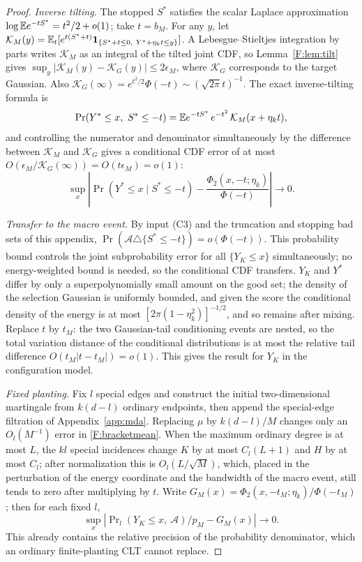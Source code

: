 \begin{proof}
\emph{Inverse tilting.} The stopped $S^*$ satisfies the scalar Laplace approximation
$\log\mathbb E e^{-tS^*}=t^2/2+o(1)$; take $t=b_M$. For any $y$, let
$\mathcal K_M(y)=\mathbb E_t[e^{t(S^*+t)}\mathbf1_{\{S^*+t\le0,\ Y^*+\eta_kt\le y\}}]$. A
Lebesgue--Stieltjes integration by parts writes $\mathcal K_M$ as an integral of the tilted joint
CDF, so Lemma~\ref{F:lem:tilt} gives $\sup_y|\mathcal K_M(y)-\mathcal K_G(y)|\le2\epsilon_M$,
where $\mathcal K_G$ corresponds to the target Gaussian. Also
$\mathcal K_G(\infty)=e^{t^2/2}\Phi(-t)\sim(\sqrt{2\pi}t)^{-1}$. The exact inverse-tilting
formula is
\[
\Pr(Y^*\le x,\ S^*\le-t)=\mathbb E e^{-tS^*}\,e^{-t^2}\,\mathcal K_M(x+\eta_kt),
\]
and controlling the numerator and denominator simultaneously by the difference between
$\mathcal K_M$ and $\mathcal K_G$ gives a conditional CDF error of at most
$O(\epsilon_M/\mathcal K_G(\infty))=O(t\epsilon_M)=o(1)$:
\[
\sup_x\left|\Pr(Y^*\le x\mid S^*\le-t)-\frac{\Phi_2(x,-t;\eta_k)}{\Phi(-t)}\right|\to0.
\]

\emph{Transfer to the macro event.} By input (C3) and the truncation and stopping bad sets of
this appendix, $\Pr(\mathcal A\triangle\{S^*\le-t\})=o(\Phi(-t))$. This probability bound
controls the joint subprobability error for all $\{Y_K\le x\}$ simultaneously; no energy-weighted
bound is needed, so the conditional CDF transfers. $Y_K$ and $Y^*$ differ by only a
superpolynomially small amount on the good set; the density of the selection Gaussian is uniformly
bounded, and given the score the conditional density of the energy is at most
$[2\pi(1-\eta_k^2)]^{-1/2}$, and so remains after mixing. Replace $t$ by $t_M$: the two
Gaussian-tail conditioning events are nested, so the total variation distance of the conditional
distributions is at most the relative tail difference $O(t_M|t-t_M|)=o(1)$. This gives the result
for $Y_K$ in the configuration model.

\emph{Fixed planting.} Fix $l$ special edges and construct the initial two-dimensional martingale
from $k(d-l)$ ordinary endpoints, then append the special-edge filtration of
Appendix~\ref{app:mda}. Replacing $\mu$ by $k(d-l)/M$ changes only an $O_l(M^{-1})$ error in
\eqref{F:bracketmean}. When the maximum ordinary degree is at most $L$, the $kl$ special
incidences change $K$ by at most $C_l(L+1)$ and $H$ by at most $C_l$; after normalization this is
$O_l(L/\sqrt M)$, which, placed in the perturbation of the energy coordinate and the bandwidth of
the macro event, still tends to zero after multiplying by $t$. Write
$G_M(x)=\Phi_2(x,-t_M;\eta_k)/\Phi(-t_M)$; then for each fixed $l$,
\begin{equation*}
\sup_x\left|\Pr\nolimits_l(Y_K\le x,\ \mathcal A)/p_M-G_M(x)\right|\to0.
\end{equation*}
This already contains the relative precision of the probability denominator, which an ordinary
finite-planting CLT cannot replace.


\end{proof}
